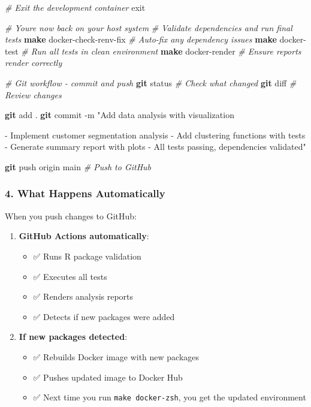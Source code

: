 \documentclass[
]{article}
\newenvironment{Shaded}{\begin{snugshade}}{\end{snugshade}}
\newcommand{\AttributeTok}[1]{\textcolor[rgb]{0.13,0.29,0.53}{#1}}
\newcommand{\BuiltInTok}[1]{#1}
\newcommand{\CommentTok}[1]{\textcolor[rgb]{0.56,0.35,0.01}{\textit{#1}}}
\newcommand{\FunctionTok}[1]{\textcolor[rgb]{0.13,0.29,0.53}{\textbf{#1}}}
\newcommand{\NormalTok}[1]{#1}
\newcommand{\StringTok}[1]{\textcolor[rgb]{0.31,0.60,0.02}{#1}}
\providecommand{\tightlist}{%
  \setlength{\itemsep}{0pt}\setlength{\parskip}{0pt}}
\begin{document}
\begin{Shaded}
\begin{Highlighting}[]
\CommentTok{\# Exit the development container}
\BuiltInTok{exit}

\CommentTok{\# You\textquotesingle{}re now back on your host system}
\CommentTok{\# Validate dependencies and run final tests}
\FunctionTok{make}\NormalTok{ docker{-}check{-}renv{-}fix    }\CommentTok{\# Auto{-}fix any dependency issues}
\FunctionTok{make}\NormalTok{ docker{-}test             }\CommentTok{\# Run all tests in clean environment}
\FunctionTok{make}\NormalTok{ docker{-}render           }\CommentTok{\# Ensure reports render correctly}

\CommentTok{\# Git workflow {-} commit and push}
\FunctionTok{git}\NormalTok{ status                   }\CommentTok{\# Check what changed}
\FunctionTok{git}\NormalTok{ diff                    }\CommentTok{\# Review changes}

\FunctionTok{git}\NormalTok{ add .}
\FunctionTok{git}\NormalTok{ commit }\AttributeTok{{-}m} \StringTok{"Add data analysis with visualization}

\StringTok{{-} Implement customer segmentation analysis}
\StringTok{{-} Add clustering functions with tests}
\StringTok{{-} Generate summary report with plots}
\StringTok{{-} All tests passing, dependencies validated"}

\FunctionTok{git}\NormalTok{ push origin main        }\CommentTok{\# Push to GitHub}
\end{Highlighting}
\end{Shaded}

\subsubsection{4. What Happens
Automatically}\label{what-happens-automatically}

When you push changes to GitHub:

\begin{enumerate}
\def\labelenumi{\arabic{enumi}.}
\tightlist
\item
  \textbf{GitHub Actions automatically}:

  \begin{itemize}
  \tightlist
  \item
    ✅ Runs R package validation
  \item
    ✅ Executes all tests
  \item
    ✅ Renders analysis reports
  \item
    ✅ Detects if new packages were added
  \end{itemize}
\item
  \textbf{If new packages detected}:

  \begin{itemize}
  \tightlist
  \item
    ✅ Rebuilds Docker image with new packages
  \item
    ✅ Pushes updated image to Docker Hub
  \item
    ✅ Next time you run \texttt{make\ docker-zsh}, you get the updated
    environment
  \end{itemize}
\end{enumerate}
\end{document}
